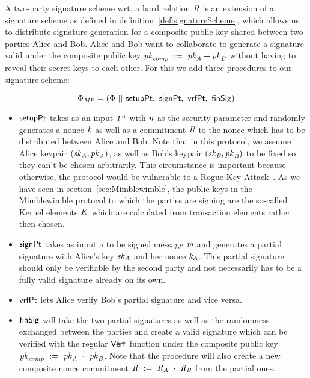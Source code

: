 \begin{definition}
    \label{def:twoPartySig}
    A two-party signature scheme wrt. a hard relation $\mathit{R}$ is an extension of a signature scheme as defined in definition~\ref{def:signatureScheme}, which allows us to distribute signature generation for a composite public key shared between two parties Alice and Bob.
    Alice and Bob want to collaborate to generate a signature valid under the composite public key $\mathit{pk}_{\mathit{comp}} ~:=~ \mathit{pk}_{\mathit{A}} + \mathit{pk}_{\mathit{B}}$ without having to reveal their secret keys to each other. For this we add three procedures to our signature scheme:

    \[ \Phi_{\mathit{MP}} = (\Phi ~||~ \mathsf{setupPt} ,~ \mathsf{signPt} ,~ \mathsf{vrfPt} ,~ \mathsf{finSig}) \]
    \begin{itemize}
        \item $\mathsf{setupPt}$ takes as an input $\mathit{1^n}$ with $\mathit{n}$ as the security parameter and randomly generates a nonce $\mathit{k}$ as well as a commitment $\mathit{R}$ to the nonce which has to be distributed between Alice and Bob.
        Note that in this protocol, we assume Alice keypair $(\mathit{sk}_{\mathit{A}}, \mathit{pk}_{\mathit{A}})$, as well as Bob's keypair $(\mathit{sk}_{\mathit{B}}, \mathit{pk}_{\mathit{B}})$ to be fixed so they can't be chosen arbitrarily. This circumstance is important because otherwise, the protocol would be vulnerable to a
        Rogue-Key Attack~\cite{horster1995meta}. As we have seen in section~\ref{sec:Mimblewimble}, the public keys in the Mimblewimble protocol to which the parties are signing are the so-called Kernel elements $\mathit{K}$ which are calculated from transaction elements
        rather then chosen.
        \item $\mathsf{signPt}$ takes as input a to be signed message $\mathit{m}$ and generates a partial signature with Alice's key $\mathit{sk}_{\mathit{A}}$ and her nonce $\mathit{\mathit{k}_{\mathit{A}}}$. This partial signature should only be verifiable by the second party and not necessarily
        has to be a fully valid signature already on its own.
        \item $\mathsf{vrfPt}$ lets Alice verify Bob's partial signature and vice versa.
        \item $\mathsf{finSig}$ will take the two partial signatures as well as the randomness exchanged between the parties and create a valid signature which can be verified with the regular $\mathsf{Verf}$ function under the composite public key
        $\mathit{pk}_{\mathit{comp}} ~:=~ \mathit{pk}_{\mathit{A}} ~\cdot~ \mathit{pk}_{\mathit{B}}$. Note that the procedure will also create a new composite nonce commitment $\mathit{R} ~:=~ \mathit{R}_{\mathit{A}} ~\cdot~ \mathit{R}_{\mathit{B}}$ from the partial ones.
    \end{itemize}
\end{definition}


